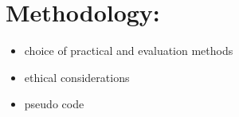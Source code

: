 \clearpage
\section{Methodology:}
\label{sec:meth}
\begin{itemize}
  \item choice of practical and evaluation methods 
  \item ethical considerations
  \item pseudo code 
\end{itemize}